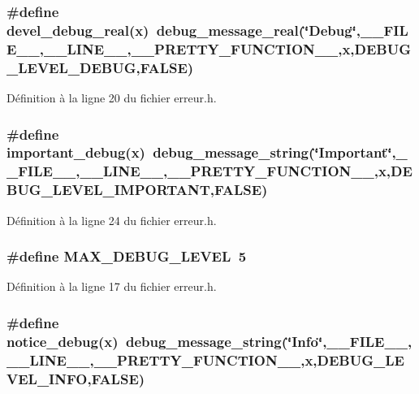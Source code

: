\subsubsection[{devel\_\-debug\_\-real}]{\setlength{\rightskip}{0pt plus 5cm}\#define devel\_\-debug\_\-real(x)~debug\_\-message\_\-real(\char`\"{}Debug\char`\"{},\_\-\_\-FILE\_\-\_\-,\_\-\_\-LINE\_\-\_\-,\_\-\_\-PRETTY\_\-FUNCTION\_\-\_\-,x,DEBUG\_\-LEVEL\_\-DEBUG,FALSE)}\label{erreur_8h_a19258644ccb654e0ef9522bdc9e84715}


Définition à la ligne 20 du fichier erreur.h.

\subsubsection[{important\_\-debug}]{\setlength{\rightskip}{0pt plus 5cm}\#define important\_\-debug(x)~debug\_\-message\_\-string(\char`\"{}Important\char`\"{},\_\-\_\-FILE\_\-\_\-,\_\-\_\-LINE\_\-\_\-,\_\-\_\-PRETTY\_\-FUNCTION\_\-\_\-,x,DEBUG\_\-LEVEL\_\-IMPORTANT,FALSE)}\label{erreur_8h_a212b1bbf19e79a680a6ee370df9d76c1}


Définition à la ligne 24 du fichier erreur.h.

\subsubsection[{MAX\_\-DEBUG\_\-LEVEL}]{\setlength{\rightskip}{0pt plus 5cm}\#define MAX\_\-DEBUG\_\-LEVEL~5}\label{erreur_8h_a18d5723f78024cc6ae507a57cbd18e15}


Définition à la ligne 17 du fichier erreur.h.

\subsubsection[{notice\_\-debug}]{\setlength{\rightskip}{0pt plus 5cm}\#define notice\_\-debug(x)~debug\_\-message\_\-string(\char`\"{}Info\char`\"{},\_\-\_\-FILE\_\-\_\-,\_\-\_\-LINE\_\-\_\-,\_\-\_\-PRETTY\_\-FUNCTION\_\-\_\-,x,DEBUG\_\-LEVEL\_\-INFO,FALSE)}\label{erreur_8h_a4538fd4861a4ef0fdec1e42edd2ebf2b}


